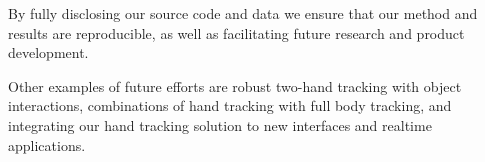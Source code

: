 By fully disclosing our source code and data we ensure that our method and results are reproducible, as well as facilitating future research and product development. 

Other examples of future efforts are robust two-hand tracking with object interactions, combinations of hand tracking with full body tracking, and integrating our hand tracking solution to new interfaces and realtime applications.





